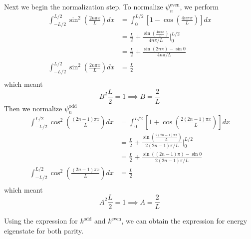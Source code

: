 \documentclass[../../../main.tex]{subfiles}
\begin{document}
Next we begin the normalization step.
To normalize $\psi_n^{\text{even}}$, we perform
\begin{align*}
    \int_{-L/2}^{L/2} \sin^2\left(\frac{2 n \pi x}{L}\right) dx & =  \int_0^{L/2} \left[1 - \cos\left(\frac{4 n \pi x}{L}\right)\right] dx                 \\
                                                                   & = \frac{L }{2 }+ \frac{\sin\left(\frac{4 n \pi x}{L}\right)}{4 n \pi / L} \Bigg|_0^{L/2} \\
                                                                   & = \frac{L }{2 }+\frac{\sin(2 n \pi) - \sin 0}{4 n \pi / L}                               \\
    \int_{-L/2}^{L/2} \sin^2\left(\frac{2 n \pi x}{L}\right) dx & =\frac{L }{2}                                                                         \\
\end{align*}
which meant 
\begin{equation*}
    B^2 \frac{L }{2 }=1\implies B=\frac{2 }{L}
\end{equation*}
Then we normalize $\psi_n^{\text{odd}}$
\begin{align*}
    \int_{-L/2}^{L/2} \cos^2\left(\frac{(2n-1) \pi x}{L}\right) dx & =  \int_0^{L/2} \left[1 + \cos\left(\frac{2 (2n-1) \pi x}{L}\right)\right] dx                   \\
                                                                      & = \frac{L }{2 }+\frac{\sin\left(\frac{2 (2n-1) \pi x}{L}\right)}{2(2n-1)\pi / L} \Bigg|_0^{L/2} \\
                                                                      & = \frac{L }{2 }+ \frac{\sin((2n-1)\pi)-\sin0}{2(2n-1)\pi / L}                                   \\
    \int_{-L/2}^{L/2} \cos^2\left(\frac{(2n-1) \pi x}{L}\right) dx & = \frac{L }{2 }\\
\end{align*}
which meant 
\begin{equation*}
    A^2 \frac{L }{2 }=1\implies A=\frac{2 }{L}
\end{equation*}

Using the expression for $k^{\text{odd}}$ and $k^{\text{even}}$, we can obtain the expression for energy eigenstate for both parity.
\end{document}
